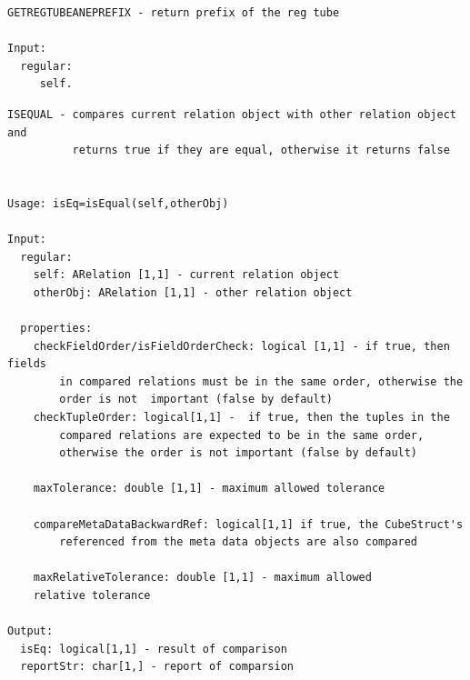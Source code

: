 \documentclass[letterpaper,10pt,english]{sphinxmanual}
\begin{document}
\begin{Verbatim}[commandchars=\\\{\}]
GETREGTUBEANEPREFIX - return prefix of the reg tube

Input:
  regular:
     self.
\end{Verbatim}

\begin{Verbatim}[commandchars=\\\{\}]
ISEQUAL - compares current relation object with other relation object and
          returns true if they are equal, otherwise it returns false


Usage: isEq=isEqual(self,otherObj)

Input:
  regular:
    self: ARelation [1,1] - current relation object
    otherObj: ARelation [1,1] - other relation object

  properties:
    checkFieldOrder/isFieldOrderCheck: logical [1,1] - if true, then fields
        in compared relations must be in the same order, otherwise the
        order is not  important (false by default)
    checkTupleOrder: logical[1,1] -  if true, then the tuples in the
        compared relations are expected to be in the same order,
        otherwise the order is not important (false by default)

    maxTolerance: double [1,1] - maximum allowed tolerance

    compareMetaDataBackwardRef: logical[1,1] if true, the CubeStruct's
        referenced from the meta data objects are also compared

    maxRelativeTolerance: double [1,1] - maximum allowed
    relative tolerance

Output:
  isEq: logical[1,1] - result of comparison
  reportStr: char[1,] - report of comparsion
\end{Verbatim}
\end{document}
